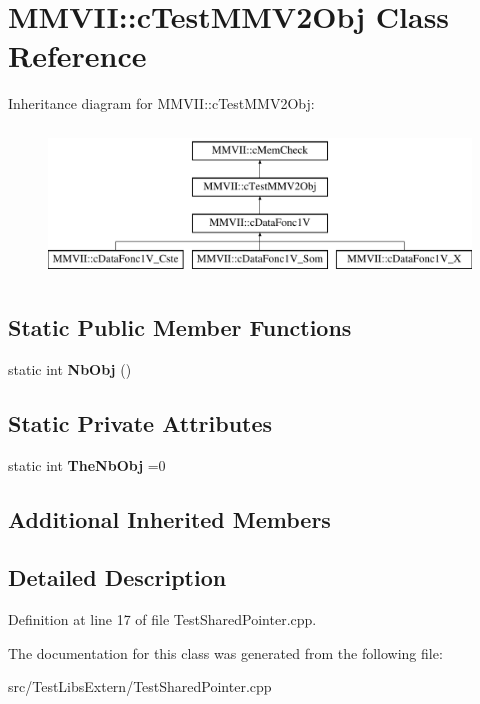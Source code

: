 \hypertarget{classMMVII_1_1cTestMMV2Obj}{}\section{M\+M\+V\+II\+:\+:c\+Test\+M\+M\+V2\+Obj Class Reference}
\label{classMMVII_1_1cTestMMV2Obj}
Inheritance diagram for M\+M\+V\+II\+:\+:c\+Test\+M\+M\+V2\+Obj\+:\begin{figure}[H]
\begin{center}
\leavevmode
\includegraphics[height=4.000000cm]{classMMVII_1_1cTestMMV2Obj}
\end{center}
\end{figure}
\subsection*{Static Public Member Functions}
\begin{DoxyCompactItemize}
\item 
static int {\bfseries Nb\+Obj} ()\hypertarget{classMMVII_1_1cTestMMV2Obj_a9699c36dbdf9ec4cd27361bbc228de24}{}\label{classMMVII_1_1cTestMMV2Obj_a9699c36dbdf9ec4cd27361bbc228de24}

\end{DoxyCompactItemize}
\subsection*{Static Private Attributes}
\begin{DoxyCompactItemize}
\item 
static int {\bfseries The\+Nb\+Obj} =0\hypertarget{classMMVII_1_1cTestMMV2Obj_adb83477b6abd13a791fb23937fd7fd81}{}\label{classMMVII_1_1cTestMMV2Obj_adb83477b6abd13a791fb23937fd7fd81}

\end{DoxyCompactItemize}
\subsection*{Additional Inherited Members}


\subsection{Detailed Description}


Definition at line 17 of file Test\+Shared\+Pointer.\+cpp.



The documentation for this class was generated from the following file\+:\begin{DoxyCompactItemize}
\item 
src/\+Test\+Libs\+Extern/Test\+Shared\+Pointer.\+cpp\end{DoxyCompactItemize}
